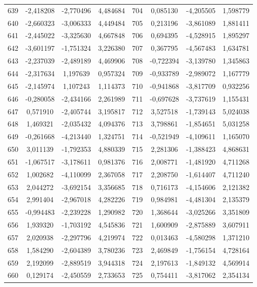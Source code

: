 \begin{apendicesenv}
\begin{table}[H]
\begin{tabular}{c c c c c c c c}
		639 & -2,418208 & -2,770496 & 4,484684 & 704 & 0,085130 & -4,205505 & 1,598779 \\
		640 & -2,660323 & -3,006333 & 4,449484 & 705 & 0,213196 & -3,861089 & 1,881411 \\
		641 & -2,445022 & -3,325630 & 4,667848 & 706 & 0,694395 & -4,528915 & 1,895297 \\
		642 & -3,601197 & -1,751324 & 3,226380 & 707 & 0,367795 & -4,567483 & 1,634781 \\
		643 & -2,237039 & -2,489189 & 4,469906 & 708 & -0,722394 & -3,139780 & 1,345863 \\
		644 & -2,317634 & 1,197639 & 0,957324 & 709 & -0,933789 & -2,989072 & 1,167779 \\
		645 & -2,145974 & 1,107243 & 1,114373 & 710 & -0,941868 & -3,817709 & 0,932256 \\
		646 & -0,280058 & -2,434166 & 2,261989 & 711 & -0,697628 & -3,737619 & 1,155431 \\
		647 & 0,571910 & -2,405744 & 3,195817 & 712 & 3,527518 & -1,739143 & 5,024038 \\
		648 & 1,469321 & -2,035432 & 4,094376 & 713 & 3,798861 & -1,854651 & 5,031258 \\
		649 & -0,261668 & -4,213440 & 1,324751 & 714 & -0,521949 & -4,109611 & 1,165070 \\
		650 & 3,011139 & -1,792353 & 4,880339 & 715 & 2,281306 & -1,388423 & 4,868631 \\
		651 & -1,067517 & -3,178611 & 0,981376 & 716 & 2,008771 & -1,481920 & 4,711268 \\
		652 & 1,002682 & -4,110099 & 2,367058 & 717 & 2,208750 & -1,614407 & 4,711240 \\
		653 & 2,044272 & -3,692154 & 3,356685 & 718 & 0,716173 & -4,154606 & 2,121382 \\
		654 & 2,991404 & -2,967018 & 4,282226 & 719 & 0,984981 & -4,481304 & 2,135379 \\
		655 & -0,994483 & -2,239228 & 1,290982 & 720 & 1,368644 & -3,025266 & 3,351809 \\
		656 & 1,939320 & -1,703192 & 4,545836 & 721 & 1,600909 & -2,875889 & 3,607911 \\
		657 & 2,020938 & -2,297796 & 4,219974 & 722 & 0,013463 & -4,580298 & 1,371210 \\
		658 & 1,584290 & -2,604389 & 3,780236 & 723 & 2,469849 & -1,756154 & 4,728164 \\
		659 & 2,192099 & -2,889519 & 3,944318 & 724 & 2,197613 & -1,849132 & 4,569914 \\
		660 & 0,129174 & -2,450559 & 2,733653 & 725 & 0,754411 & -3,817062 & 2,354134 \\

\end{tabular}
\end{table}
\end{apendicesenv}

